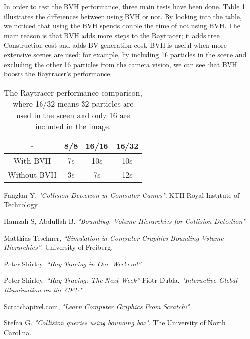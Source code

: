 \documentclass{article}
\begin{document}
	In order to test the BVH performance, three main tests have been done. Table 1 illustrates the differences between using BVH or not. By looking into the table, we noticed that using the BVH spends double the time of not using BVH. The main reason is that BVH adds more steps to the Raytracer; it adds tree Construction cost and adds BV generation cost. BVH is useful when more extensive scenes are used; for example, by including 16 particles in the scene and excluding the other 16 particles from the camera vision, we can see that BVH boosts the Raytracer's performance.
	
	\begin{table}[h!]
		\centering
		\begin{tabular}{||c c c c||} 
			\hline
			- & 8/8  & 16/16 & 16/32 \\ [0.5ex] 
			\hline\hline
			With BVH & 7s & 10s & 10s \\ 
			\hline
			Without BVH & 3s & 7s & 12s \\
			\hline
			
		\end{tabular}
		\caption{The Raytracer performance comparison, where 16/32 means 32 particles are used in the sceen and only 16 are included in the image.}
		\label{table:1}
	\end{table}
	
	
	\clearpage
	
	\begin{thebibliography}{9}
		Fangkai Y. 	\textit{"Collision Detection in Computer Games"}. KTH Royal Institute of Technology.
		
		Hamzah S, Abdullah B. 	\textit{"Bounding. Volume Hierarchies for Collision Detection"}
		
		Matthias Teschner, 	\textit{“Simulation in Computer Graphics Bounding Volume Hierarchies”}, University of Freiburg.
		
		Peter Shirley. 	\textit{“Ray Tracing in One Weekend”}
		
		Peter Shirley. 	\textit{“Ray Tracing: The Next Week”}
		Piotr Dubla. 	\textit{"Interactive Global Illumination on the CPU"}
		
		Scratchapixel.com,	\textit{"Learn Computer Graphics From Scratch!"}
		
		
		Stefan G.	\textit{"Collision queries using bounding box"}. The University of North Carolina.
		
		
		
		
	\end{thebibliography}
	
	
\end{document}
